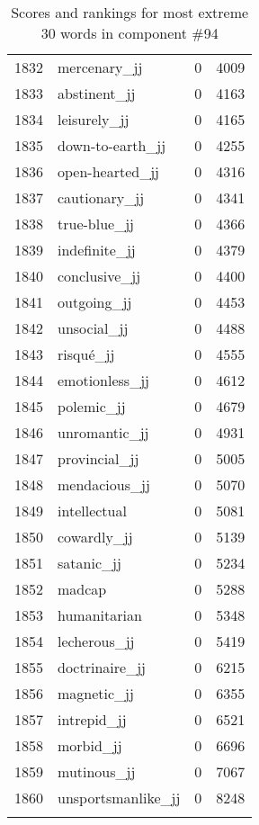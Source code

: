 \begin{longtable}[!htbp]{| rlr@{.}l |}
    1832 & mercenary\_jj & 0 & 4009 \\
    1833 & abstinent\_jj & 0 & 4163 \\
    1834 & leisurely\_jj & 0 & 4165 \\
    1835 & down-to-earth\_jj & 0 & 4255 \\
    1836 & open-hearted\_jj & 0 & 4316 \\
    1837 & cautionary\_jj & 0 & 4341 \\
    1838 & true-blue\_jj & 0 & 4366 \\
    1839 & indefinite\_jj & 0 & 4379 \\
    1840 & conclusive\_jj & 0 & 4400 \\
    1841 & outgoing\_jj & 0 & 4453 \\
    1842 & unsocial\_jj & 0 & 4488 \\
    1843 & risqué\_jj & 0 & 4555 \\
    1844 & emotionless\_jj & 0 & 4612 \\
    1845 & polemic\_jj & 0 & 4679 \\
    1846 & unromantic\_jj & 0 & 4931 \\
    1847 & provincial\_jj & 0 & 5005 \\
    1848 & mendacious\_jj & 0 & 5070 \\
    1849 & intellectual & 0 & 5081 \\
    1850 & cowardly\_jj & 0 & 5139 \\
    1851 & satanic\_jj & 0 & 5234 \\
    1852 & madcap & 0 & 5288 \\
    1853 & humanitarian & 0 & 5348 \\
    1854 & lecherous\_jj & 0 & 5419 \\
    1855 & doctrinaire\_jj & 0 & 6215 \\
    1856 & magnetic\_jj & 0 & 6355 \\
    1857 & intrepid\_jj & 0 & 6521 \\
    1858 & morbid\_jj & 0 & 6696 \\
    1859 & mutinous\_jj & 0 & 7067 \\
    1860 & unsportsmanlike\_jj & 0 & 8248 \\
    \hline
    \caption{Scores and rankings for most extreme 30 words in component \#94} \\
\end{longtable}
